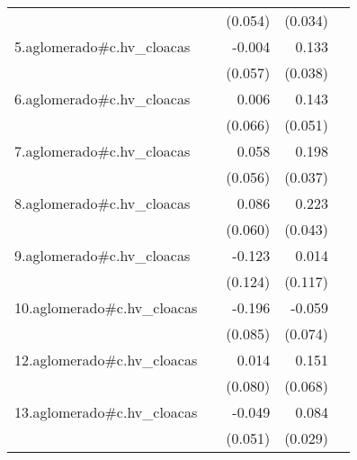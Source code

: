{\begin{longtable}{l*{4}{D{.}{.}{-1}}}
            &                     &     (0.054)         &     (0.034)         &                     \\
\addlinespace
5.aglomerado#c.hv\_cloacas&                     &      -0.004         &       0.133\sym{***}&                     \\
            &                     &     (0.057)         &     (0.038)         &                     \\
\addlinespace
6.aglomerado#c.hv\_cloacas&                     &       0.006         &       0.143\sym{**} &                     \\
            &                     &     (0.066)         &     (0.051)         &                     \\
\addlinespace
7.aglomerado#c.hv\_cloacas&                     &       0.058         &       0.198\sym{***}&                     \\
            &                     &     (0.056)         &     (0.037)         &                     \\
\addlinespace
8.aglomerado#c.hv\_cloacas&                     &       0.086         &       0.223\sym{***}&                     \\
            &                     &     (0.060)         &     (0.043)         &                     \\
\addlinespace
9.aglomerado#c.hv\_cloacas&                     &      -0.123         &       0.014         &                     \\
            &                     &     (0.124)         &     (0.117)         &                     \\
\addlinespace
10.aglomerado#c.hv\_cloacas&                     &      -0.196\sym{*}  &      -0.059         &                     \\
            &                     &     (0.085)         &     (0.074)         &                     \\
\addlinespace
12.aglomerado#c.hv\_cloacas&                     &       0.014         &       0.151\sym{*}  &                     \\
            &                     &     (0.080)         &     (0.068)         &                     \\
\addlinespace
13.aglomerado#c.hv\_cloacas&                     &      -0.049         &       0.084\sym{**} &                     \\
            &                     &     (0.051)         &     (0.029)         &                     \\

\end{longtable}}
